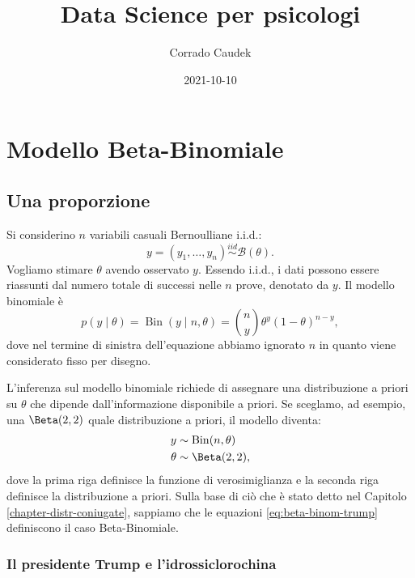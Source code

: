 \documentclass[
]{memoir}
\title{Data Science per psicologi}
\author{Corrado Caudek}
\date{2021-10-10}
\DeclareMathOperator{\Bin}{Bin} %
\begin{document}
\maketitle

{
\hypersetup{linkcolor=}
\setcounter{tocdepth}{1}
\tableofcontents
}
\newpage

\vspace*{5cm}

\thispagestyle{empty}

\hypertarget{mod-binom}{%
\chapter{Modello Beta-Binomiale}\label{mod-binom}}

\hypertarget{una-proporzione}{%
\section{Una proporzione}\label{una-proporzione}}

Si considerino \(n\) variabili casuali Bernoulliane i.i.d.:
\[
y = (y_1, \dots, y_n) \stackrel{iid}{\sim} \mathcal{B}(\theta).
\]
\noindent
Vogliamo stimare \(\theta\) avendo osservato \(y\). Essendo i.i.d., i dati possono essere riassunti dal numero totale di successi nelle \(n\) prove, denotato da \(y\). Il modello binomiale è
\begin{equation}
p(y \mid \theta) = \Bin(y \mid n, \theta) = \binom{n}{y}\theta^y (1 -\theta)^{n-y},
\end{equation}
\noindent
dove nel termine di sinistra dell'equazione abbiamo ignorato \(n\) in quanto viene considerato fisso per disegno.

L'inferenza sul modello binomiale richiede di assegnare una distribuzione a priori su \(\theta\) che dipende dall'informazione disponibile a priori. Se sceglamo, ad esempio, una \(\Beta(2, 2)\) quale distribuzione a priori, il modello diventa:
\begin{align}
y &\sim \Bin(n, \theta) \notag\\
\theta &\sim \Beta(2, 2),
\label{eq:beta-binom-trump}
\end{align}
\noindent
dove la prima riga definisce la funzione di verosimiglianza e la seconda riga definisce la distribuzione a priori. Sulla base di ciò che è stato detto nel Capitolo \ref{chapter-distr-coniugate}, sappiamo che le equazioni \eqref{eq:beta-binom-trump} definiscono il caso Beta-Binomiale.

\hypertarget{il-presidente-trump-e-lidrossiclorochina}{%
\subsection{Il presidente Trump e l'idrossiclorochina}\label{il-presidente-trump-e-lidrossiclorochina}}
\end{document}
